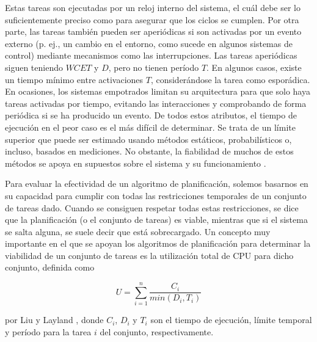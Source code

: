 Estas tareas son ejecutadas por un reloj interno del sistema, el cuál debe ser
lo suficientemente preciso como para asegurar que los ciclos se cumplen. Por
otra parte, las tareas también pueden ser aperiódicas si son activadas por un
evento externo (p. ej., un cambio en el entorno, como sucede en algunos sistemas
de control) mediante mecanismos como las interrupciones. Las tareas aperiódicas
siguen teniendo $WCET$ y $D$, pero no tienen período $T$. En algunos casos,
existe un tiempo mínimo entre activaciones $T$, considerándose la tarea como
esporádica. En ocasiones, los sistemas empotrados limitan su arquitectura para
que solo haya tareas activadas por tiempo, evitando las interacciones y
comprobando de forma periódica si se ha producido un evento. De todos estos
atributos, el tiempo de ejecución en el peor caso es el más difícil de
determinar. Se trata de un límite superior que puede ser estimado usando métodos
estáticos, probabilísticos o, incluso, basados en mediciones. No obstante, la
fiabilidad de muchos de estos métodos se apoya en supuestos sobre el sistema y
su funcionamiento \cite{abella_wcet_2015}.

Para evaluar la efectividad de un algoritmo de planificación, solemos basarnos
en su capacidad para cumplir con todas las restricciones temporales de un
conjunto de tareas dado. Cuando se consiguen respetar todas estas restricciones,
se dice que la planificación (o el conjunto de tareas) es viable, mientras que
si el sistema se salta alguna, se suele decir que está sobrecargado. Un concepto
muy importante en el que se apoyan los algoritmos de planificación para
determinar la viabilidad de un conjunto de tareas es la utilización total de CPU
para dicho conjunto, definida como

\begin{equation}
  U = \sum_{i=1}^{n} \frac{C_{i}}{min(D_{i}, T_{i})}
\end{equation}

por Liu y Layland \cite{liu_scheduling_1973}, donde $C_{i}$, $D_{i}$ y $T_{i}$
son el tiempo de ejecución, límite temporal y período para la tarea $i$ del
conjunto, respectivamente.

